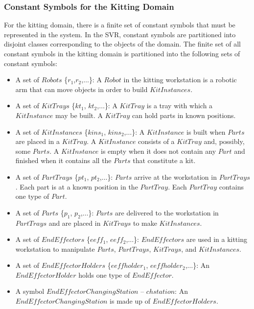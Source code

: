 \documentclass[a4paper, 10pt, conference]{ieeeconf}      %
\begin{document}
\subsubsection{Constant Symbols for the Kitting Domain}
For the kitting domain, there is a finite set of constant symbols that must be represented in the system.
In the SVR, constant symbols are partitioned into disjoint classes corresponding to the objects of the domain. The finite set of all constant symbols in the kitting domain is partitioned into the following sets of constant symbols:
\begin{itemize}
\item A set of $Robots$ \{$ r_1$,$ r_2$,$\dots$\}: A $Robot$ in the kitting workstation is a robotic arm that can move objects in order to build $KitInstances$.

\item A set of $KitTrays$ \{$ kt_1$, $kt_2$,$\dots$\}: A $KitTray$ is a tray with which a $KitInstance$ may be built. A $KitTray$ can hold parts in known positions.

\item A set of $KitInstances$ \{$kins_1$, $kins_2$,$\dots$\}: A $KitInstance$ is built when $Parts$ are placed in a $KitTray$. A $KitInstance$ consists of a $KitTray$ and, possibly, some $Parts$. A $KitInstance$ is empty when it does not contain any $Part$ and finished when it contains all the $Parts$ that constitute a kit.

\item A set of $PartTrays$ \{$pt_1$, $pt_2$,$\dots$\}: $Parts$ arrive at the workstation in $PartTrays$. Each part is at a known position in the $PartTray$. Each $PartTray$ contains one type of $Part$.

\item A set of $Parts$ \{$p_1$, $p_2$,$\dots$\}: $Parts$ are delivered to the workstation in $PartTrays$ and are placed in $KitTrays$ to make $KitInstances$.

\item A set of $EndEffectors$ \{$eeff_1$, $eeff_2$,$\dots$\}: $EndEffectors$ are used in a kitting workstation to manipulate $Parts$, $PartTrays$, $KitTrays$, and $KitInstances$.

\item A set of $EndEffectorHolders$  \{$eeffholder_1$, $eeffholder_2$,$\dots$\}: An $EndEffectorHolder$ holds one type of $EndEffector$.

\item A symbol $EndEffectorChangingStation$ -- $chstation$: An $EndEffectorChangingStation$ is made up of $EndEffectorHolders$.


\end{itemize}
\end{document}
